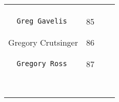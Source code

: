 \documentclass[]{article}
\begin{document}
\begin{longtable}[c]{@{}llll@{}}
\begin{minipage}[t]{0.13\columnwidth}
\end{minipage} & \begin{minipage}[t]{0.15\columnwidth}\raggedright
\end{minipage}
\\\noalign{\medskip}
\begin{minipage}[t]{0.39\columnwidth}\raggedright
\begin{verbatim}
  Greg Gavelis
\end{verbatim}
\end{minipage} & \begin{minipage}[t]{0.10\columnwidth}\raggedright
85
\end{minipage} & \begin{minipage}[t]{0.13\columnwidth}\raggedright
\end{minipage} & \begin{minipage}[t]{0.15\columnwidth}\raggedright
\end{minipage}
\\\noalign{\medskip}
\begin{minipage}[t]{0.39\columnwidth}\raggedright
Gregory Crutsinger
\end{minipage} & \begin{minipage}[t]{0.10\columnwidth}\raggedright
86
\end{minipage} & \begin{minipage}[t]{0.13\columnwidth}\raggedright
\end{minipage} & \begin{minipage}[t]{0.15\columnwidth}\raggedright
\end{minipage}
\\\noalign{\medskip}
\begin{minipage}[t]{0.39\columnwidth}\raggedright
\begin{verbatim}
  Gregory Ross
\end{verbatim}
\end{minipage} & \begin{minipage}[t]{0.10\columnwidth}\raggedright
87
\end{minipage} & \begin{minipage}[t]{0.13\columnwidth}\raggedright
\end{minipage} & \begin{minipage}[t]{0.15\columnwidth}\raggedright
\end{minipage}
\\\noalign{\medskip}
\begin{minipage}[t]{0.39\columnwidth}\raggedright
\begin{verbatim}

\end{verbatim}
\end{minipage}
\end{longtable}
\end{document}
